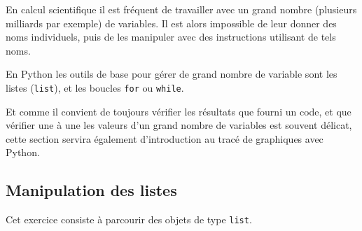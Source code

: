 

En calcul scientifique il est fréquent de travailler avec un grand nombre
(plusieurs milliards par exemple) de variables. Il est alors impossible de
leur donner des noms individuels, puis
de les manipuler avec des instructions utilisant de tels noms.

En Python les outils de base pour gérer de grand nombre de variable
sont les listes (\verb+list+), et les boucles \verb+for+ ou \verb+while+.

Et comme il convient de toujours vérifier les résultats que fourni un code, et
que vérifier une à une les valeurs d'un grand nombre de variables est
souvent délicat, cette section servira également d'introduction au tracé de
graphiques avec Python.

\subsection{Manipulation des listes}
Cet exercice consiste à parcourir des objets de type \texttt{list}.

